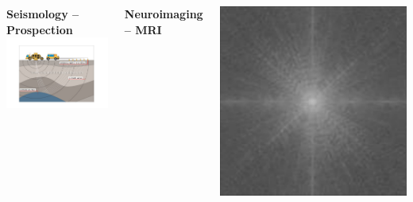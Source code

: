 \documentclass{beamer}
\begin{document}
{\begin{columns}[T]
            {\bf Seismology -- Prospection}\\[.5em]
            {\centering\includegraphics[width=.5\textwidth, trim={6.7em 4em 7em 5em}, clip]{InverseProblem_petroleum}\\}


            {\bf Neuroimaging -- MRI}\\[1em]
                \begin{columns}[c]
                    \centering
                \includegraphics[width=.8\textwidth]{K_space}\\
                 \centering

\end{columns}
\end{columns}}
\end{document}

